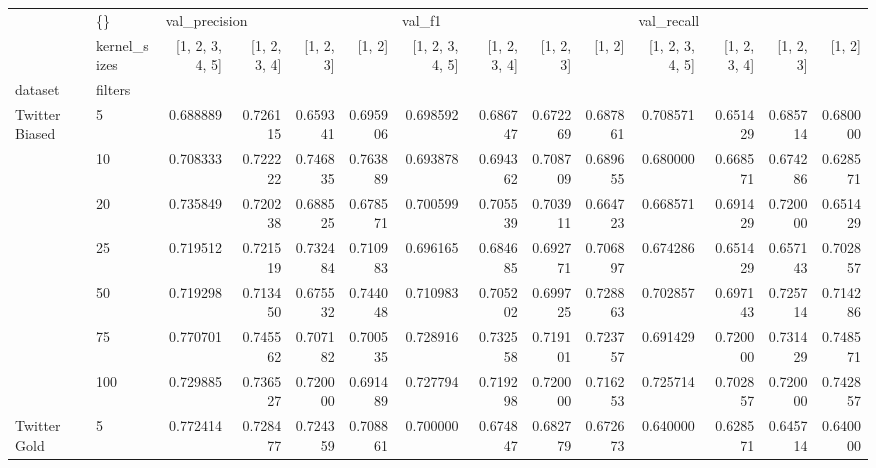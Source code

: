 \begin{tabular}{llrrrrrrrrrrrr}
\toprule
               & \{\} & \multicolumn{4}{l}{val\_precision} & \multicolumn{4}{l}{val\_f1} & \multicolumn{4}{l}{val\_recall} \\
               & kernel\_sizes & [1, 2, 3, 4, 5] & [1, 2, 3, 4] & [1, 2, 3] &    [1, 2] & [1, 2, 3, 4, 5] & [1, 2, 3, 4] & [1, 2, 3] &    [1, 2] & [1, 2, 3, 4, 5] & [1, 2, 3, 4] & [1, 2, 3] &    [1, 2] \\
dataset & filters &                 &              &           &           &                 &              &           &           &                 &              &           &           \\
\midrule
Twitter Biased & 5   &        0.688889 &     0.726115 &  0.659341 &  0.695906 &        0.698592 &     0.686747 &  0.672269 &  0.687861 &        0.708571 &     0.651429 &  0.685714 &  0.680000 \\
               & 10  &        0.708333 &     0.722222 &  0.746835 &  0.763889 &        0.693878 &     0.694362 &  0.708709 &  0.689655 &        0.680000 &     0.668571 &  0.674286 &  0.628571 \\
               & 20  &        0.735849 &     0.720238 &  0.688525 &  0.678571 &        0.700599 &     0.705539 &  0.703911 &  0.664723 &        0.668571 &     0.691429 &  0.720000 &  0.651429 \\
               & 25  &        0.719512 &     0.721519 &  0.732484 &  0.710983 &        0.696165 &     0.684685 &  0.692771 &  0.706897 &        0.674286 &     0.651429 &  0.657143 &  0.702857 \\
               & 50  &        0.719298 &     0.713450 &  0.675532 &  0.744048 &        0.710983 &     0.705202 &  0.699725 &  0.728863 &        0.702857 &     0.697143 &  0.725714 &  0.714286 \\
               & 75  &        0.770701 &     0.745562 &  0.707182 &  0.700535 &        0.728916 &     0.732558 &  0.719101 &  0.723757 &        0.691429 &     0.720000 &  0.731429 &  0.748571 \\
               & 100 &        0.729885 &     0.736527 &  0.720000 &  0.691489 &        0.727794 &     0.719298 &  0.720000 &  0.716253 &        0.725714 &     0.702857 &  0.720000 &  0.742857 \\
Twitter Gold & 5   &        0.772414 &     0.728477 &  0.724359 &  0.708861 &        0.700000 &     0.674847 &  0.682779 &  0.672673 &        0.640000 &     0.628571 &  0.645714 &  0.640000 \\

\end{tabular}
